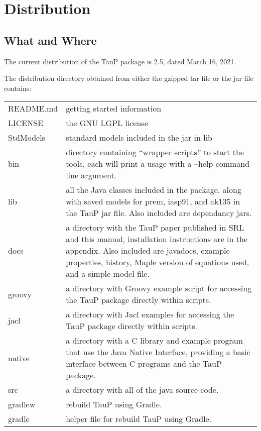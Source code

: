 
\section{Distribution}


\subsection{What and Where}
The current distribution of the TauP package is 2.5, dated March 16, 2021.

The distribution directory obtained from either the gzipped tar file or the jar file contains:

\begin{center}
\begin{tabular}{lp{4in}}
README.md & getting started information \\
LICENSE & the GNU LGPL license \\
StdModels & standard models included in the jar in lib \\
bin & directory containing ``wrapper scripts'' to start the tools,
   each will print a usage with a --help command line argument. \\
lib & all the Java classes included in the package, along with
               saved models for prem, iasp91, and ak135 in the TauP jar file.
               Also included are dependancy jars. \\
docs & a directory with the TauP paper published in SRL and this manual,
installation instructions are in the appendix. Also included are javadocs,
example properties, history, Maple version of equations used, and a simple model file.\\
groovy & a directory with Groovy example script for accessing the TauP package directly within scripts. \\
jacl & a directory with Jacl examples for accessing the TauP package directly within scripts. \\
native & a directory with a C library and example program that use the
Java Native Interface, providing a basic interface between C programs
and the TauP package. \\
src & a directory with all of the java source code. \\
gradlew & rebuild TauP using Gradle. \\
gradle & helper file for rebuild TauP using Gradle. \\
\end{tabular}
\end{center}

